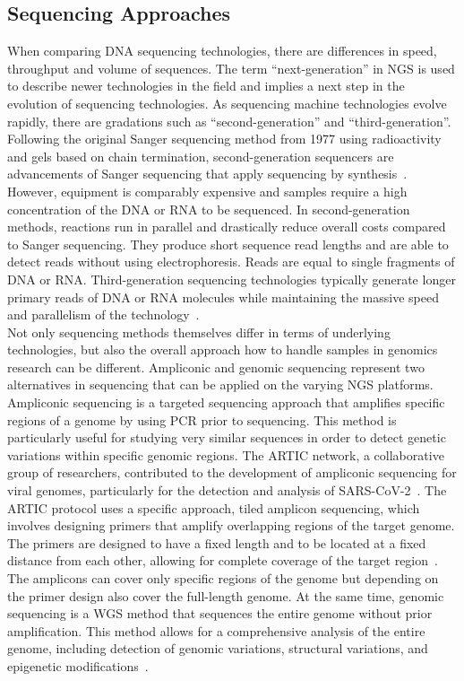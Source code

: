 \subsection{Sequencing Approaches}
When comparing \ac{DNA} sequencing technologies, there are differences in speed, throughput and volume of sequences. The term ``next-generation'' in \ac{NGS} is used to describe newer technologies in the field and implies a next step in the evolution of sequencing technologies. As sequencing machine technologies evolve rapidly, there are gradations such as ``second-generation'' and ``third-generation''. Following the original Sanger sequencing method from 1977 using radioactivity and gels based on chain termination, second-generation sequencers are advancements of Sanger sequencing that apply sequencing by synthesis~\cite{mardis2008next}. However, equipment is comparably expensive and samples require a high concentration of the \ac{DNA} or \ac{RNA} to be sequenced. In second-generation methods, reactions run in parallel and drastically reduce overall costs compared to Sanger sequencing. They produce short sequence read lengths and are able to detect reads without using electrophoresis. Reads are equal to single fragments of \ac{DNA} or \ac{RNA}. Third-generation sequencing technologies typically generate longer primary reads of \ac{DNA} or \ac{RNA} molecules while maintaining the massive speed and parallelism of the technology~\cite{slatko2018overview}. \\
Not only sequencing methods themselves differ in terms of underlying technologies, but also the overall approach how to handle samples in genomics research can be different. Ampliconic and genomic sequencing represent two alternatives in sequencing that can be applied on the varying \ac{NGS} platforms. Ampliconic sequencing is a targeted sequencing approach that amplifies specific regions of a genome by using \ac{PCR} prior to sequencing. This method is particularly useful for studying very similar sequences in order to detect genetic variations within specific genomic regions. The ARTIC network, a collaborative group of researchers, contributed to the development of ampliconic sequencing for viral genomes, particularly for the detection and analysis of \ac{SARS-CoV-2}~\cite{quick2017multiplex, tyson2020improvements}. The ARTIC protocol uses a specific approach, tiled amplicon sequencing, which involves designing primers that amplify overlapping regions of the target genome. The primers are designed to have a fixed length and to be located at a fixed distance from each other, allowing for complete coverage of the target region~\cite{mamanova2010target}. The amplicons can cover only specific regions of the genome but depending on the primer design also cover the full-length genome. At the same time, genomic sequencing is a \ac{WGS} method that sequences the entire genome without prior amplification. This method allows for a comprehensive analysis of the entire genome, including detection of genomic variations, structural variations, and epigenetic modifications~\cite{quick2017multiplex}.

